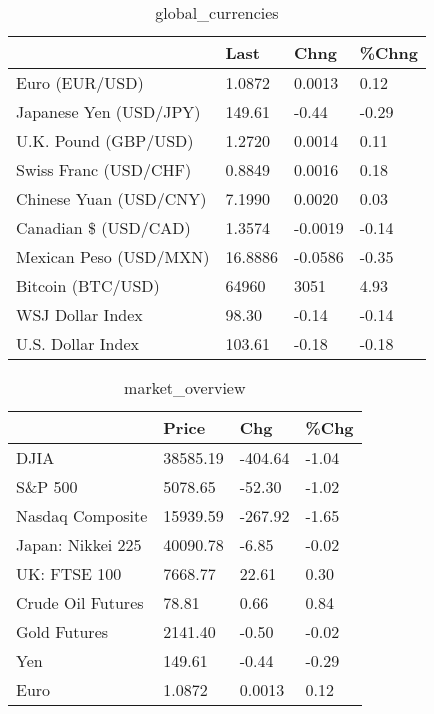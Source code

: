 \documentclass{article}%
\begin{document}
%


\begin{table}[htbp]%
\caption{global\_currencies}%
\centering%
\begin{adjustbox}{width=1\textwidth}%
\begin{tabular}{llll}
\toprule
                       &    Last &    Chng & \%Chng \\
\midrule
        Euro (EUR/USD) &  1.0872 &  0.0013 &  0.12 \\
Japanese Yen (USD/JPY) &  149.61 &   -0.44 & -0.29 \\
  U.K. Pound (GBP/USD) &  1.2720 &  0.0014 &  0.11 \\
 Swiss Franc (USD/CHF) &  0.8849 &  0.0016 &  0.18 \\
Chinese Yuan (USD/CNY) &  7.1990 &  0.0020 &  0.03 \\
  Canadian \$ (USD/CAD) &  1.3574 & -0.0019 & -0.14 \\
Mexican Peso (USD/MXN) & 16.8886 & -0.0586 & -0.35 \\
     Bitcoin (BTC/USD) &   64960 &    3051 &  4.93 \\
      WSJ Dollar Index &   98.30 &   -0.14 & -0.14 \\
     U.S. Dollar Index &  103.61 &   -0.18 & -0.18 \\
\bottomrule
\end{tabular}
%
\end{adjustbox}%
\end{table}

%


\begin{table}[htbp]%
\caption{market\_overview}%
\centering%
\begin{adjustbox}{width=1\textwidth}%
\begin{tabular}{llll}
\toprule
                  &    Price &     Chg &  \%Chg \\
\midrule
             DJIA & 38585.19 & -404.64 & -1.04 \\
          S\&P 500 &  5078.65 &  -52.30 & -1.02 \\
 Nasdaq Composite & 15939.59 & -267.92 & -1.65 \\
Japan: Nikkei 225 & 40090.78 &   -6.85 & -0.02 \\
     UK: FTSE 100 &  7668.77 &   22.61 &  0.30 \\
Crude Oil Futures &    78.81 &    0.66 &  0.84 \\
     Gold Futures &  2141.40 &   -0.50 & -0.02 \\
              Yen &   149.61 &   -0.44 & -0.29 \\
             Euro &   1.0872 &  0.0013 &  0.12 \\
\bottomrule
\end{tabular}
%
\end{adjustbox}%
\end{table}

%
\end{document}
